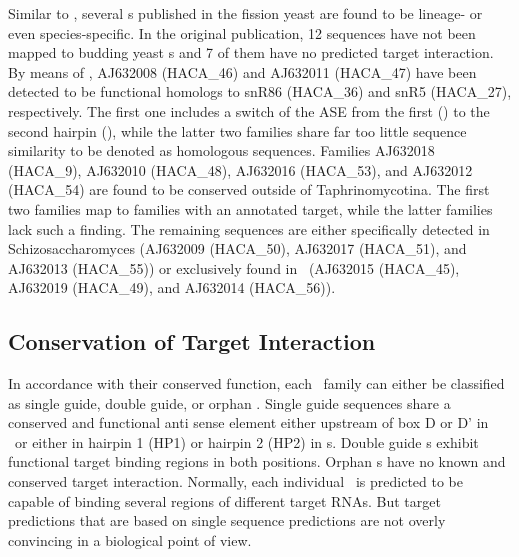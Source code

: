 Similar to \calb, several \sno s published in the fission yeast
\cite{Li:2005} are found to be lineage- or even species-specific. In
the original publication, 12 sequences have not been mapped to budding
yeast \sno s and 7 of them have no predicted target interaction. By
means of \snostrip, AJ632008 (HACA\_46) and AJ632011
(HACA\_47) have been detected to be functional homologs to snR86
(HACA\_36) and snR5 (HACA\_27), respectively. The first one includes a
switch of the ASE from the first (\spo) to the second hairpin (\sce), while the
latter two families share far too little sequence similarity to be
denoted as homologous sequences. Families AJ632018 (HACA\_9), AJ632010
(HACA\_48), AJ632016 (HACA\_53), and AJ632012 (HACA\_54) are found to
be conserved outside of Taphrinomycotina. The first two families map
to families with an annotated target, while the latter families lack
such a finding. The remaining sequences are either specifically
detected in Schizosaccharomyces (AJ632009 (HACA\_50), AJ632017
(HACA\_51), and AJ632013 (HACA\_55)) or exclusively found in \spo\
(AJ632015 (HACA\_45), AJ632019 (HACA\_49), and AJ632014 (HACA\_56)).

\subsection{Conservation of Target Interaction}


In accordance with their conserved function, each \sno\ family can
either be classified as single guide, double guide, or orphan
\sno. Single guide sequences share a conserved and functional anti
sense element either upstream of box D or D' in \cd\ or either in
hairpin 1 (HP1) or hairpin 2 (HP2) in \haca s. Double guide \sno s
exhibit functional target binding regions in both positions. Orphan
\sno s have no known and conserved target interaction. Normally, each
individual \sno\ is predicted to be capable of binding several regions
of different target RNAs. But target predictions that are based on
single sequence predictions are not overly convincing in a biological
point of view.

